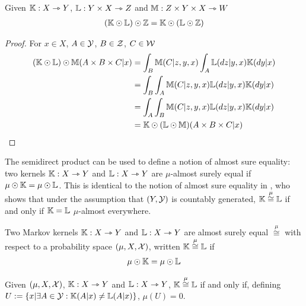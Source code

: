\begin{lemma}\label{lem:sdp_assoc}
Given $\mathbb{K}:X\rightarrowtriangle Y$, $\mathbb{L}:Y\times X\rightarrowtriangle Z$ and $\mathbb{M}:Z\times Y\times X\rightarrowtriangle W$
\begin{align}
    (\mathbb{K}\odot \mathbb{L})\odot \mathbb{Z} &= \mathbb{K}\odot(\mathbb{L}\odot\mathbb{Z})\\
\end{align}
\end{lemma}

\begin{proof}
For $x\in X$, $A\in \mathcal{Y}$, $B\in \mathcal{Z}$, $C\in \mathcal{W}$
\begin{align}
    (\mathbb{K}\odot \mathbb{L})\odot \mathbb{M}(A\times B\times C |x) &= \int_B \mathbb{M}(C|z, y,x)\int_A \mathbb{L}(dz|y, x)\mathbb{K}(dy|x)\\
    &= \int_B \int_A \mathbb{M}(C|z, y,x)\mathbb{L}(dz|y, x)\mathbb{K}(dy|x)\\
    &= \int_A \int_B \mathbb{M}(C|z, y,x)\mathbb{L}(dz|y, x)\mathbb{K}(dy|x)\\
    &= \mathbb{K}\odot (\mathbb{L}\odot \mathbb{M})(A\times B\times C |x)
\end{align}
\end{proof}

The semidirect product can be used to define a notion of almost sure equality: two kernels $\mathbb{K}:X\rightarrowtriangle Y$ and $\mathbb{L}:X\rightarrowtriangle Y$ are $\mu$-almost surely equal if $\mu\odot \mathbb{K}=\mu\odot \mathbb{L}$. This is identical to the notion of almost sure equality in \citet{cho_disintegration_2019}, who shows that under the assumption that $(Y,\mathcal{Y})$ is countably generated, $\mathbb{K}\overset{\mu}{\cong}\mathbb{L}$ if and only if $\mathbb{K}=\mathbb{L}$ $\mu$-almost everywhere.

\begin{definition}\label{def:asequal_pspace}
Two Markov kernels $\mathbb{K}:X\rightarrowtriangle Y$ and $\mathbb{L}:X\rightarrowtriangle Y$ are almost surely equal $\overset{\mu}{\cong}$ with respect to a probability space $(\mu,X,\mathcal{X})$, written $\mathbb{K}\overset{\mu}{\cong}\mathbb{L}$ if
\begin{align}
    \mu\odot \mathbb{K}=\mu\odot \mathbb{L}
\end{align}
\end{definition}

\begin{theorem}
Given $(\mu,X,\mathcal{X})$, $\mathbb{K}:X\rightarrowtriangle Y$ and $\mathbb{L}:X\rightarrowtriangle Y$, $\mathbb{K}\overset{\mu}{\cong}\mathbb{L}$ if and only if, defining $U:=\{x|\exists A\in\mathcal{Y}: \mathbb{K}(A|x)\neq\mathbb{L}(A|x)\}$, $\mu(U)=0$.
\end{theorem}

